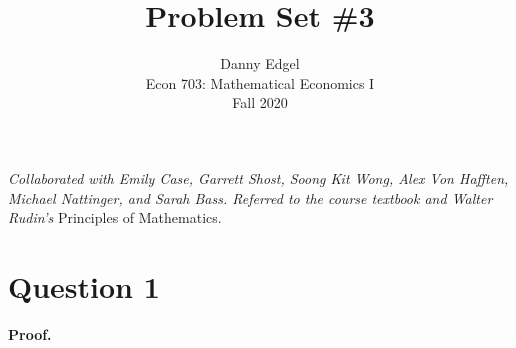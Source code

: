 \documentclass{article}
\begin{document}
\title{	Problem Set \#3 }
\author{ 	Danny Edgel 							\\ 
			Econ 703: Mathematical Economics I		\\
			Fall 2020								\\
		}
\maketitle\thispagestyle{empty}


\textit{Collaborated with Emily Case, Garrett Shost, Soong Kit Wong, Alex Von Hafften, Michael Nattinger, and Sarah Bass. Referred to the course textbook and Walter Rudin's} Principles of Mathematics.


\section*{Question 1}

\textbf{Proof.}
\end{document}
